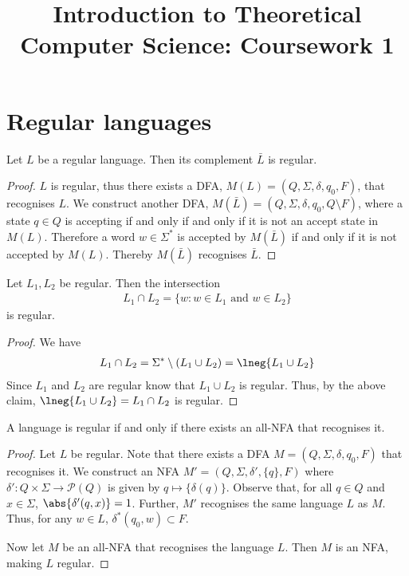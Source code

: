\documentclass{article}
\title{Introduction to Theoretical Computer Science: Coursework 1}
\begin{document}
\section{Regular languages}

\begin{claim}
	Let $L$ be a regular language. Then its complement $\bar L$ is regular.
\end{claim}
\begin{proof}
	$L$ is regular, thus there exists a DFA, $M(L)=(Q,\Sigma,\delta,q_0,F)$,
	that recognises $L$. We construct another DFA,
	$M(\bar L)=(Q,\Sigma,\delta,q_0,Q\setminus F)$, where a state $q\in Q$ is
	accepting if and only if and only if it is not an accept state in
	$M(L)$. Therefore a word $w\in\Sigma^*$ is accepted by $M(\bar L)$
	if and only if it is not accepted by $M(L)$. Thereby $M(\bar L)$
	recognises $\bar L$.
\end{proof}

\begin{claim}
	Let $L_1,L_2$ be regular. Then the intersection
	\begin{align*}
		L_1\cap L_2 = \{w : w \in L_1 \text{ and } w \in L_2\}
	\end{align*}
	is regular.
\end{claim}
\begin{proof}
	We have
	\begin{align*}
		L_1 \cap L_2 = \Sigma^*\setminus (L_1\cup L_2) = \lneg{L_1\cup L_2}
	\end{align*}
	Since $L_1$ and $L_2$ are regular know that $L_1\cup L_2$ is regular.
	Thus, by the above claim, $\lneg{L_1\cup L_2}=L_1\cap L_2$ is regular.
\end{proof}

\begin{claim}
	A language is regular if and only if there exists an all-NFA that recognises it.
\end{claim}
\begin{proof}
	Let $L$ be regular. Note that there exists a DFA $M=(Q,\Sigma,\delta,q_0,F)$
	that recognises it. We construct an NFA $M'=(Q,\Sigma,\delta',\{q\},F)$
	where $\delta':Q\times\Sigma \to \mathcal{P}(Q)$ is given by $q \mapsto \{\delta(q)\}$.
	Observe that, for all $q\in Q$ and $x\in\Sigma$, $\abs{\delta'(q,x)}=1$.
	Further, $M'$ recognises the same language $L$ as $M$.
	Thus, for any $w\in L$, $\delta^*(q_0,w)\subset F$.

	Now let $M$ be an all-NFA that recognises the language $L$. Then $M$ is an
	NFA, making $L$ regular.
\end{proof}
\end{document}
